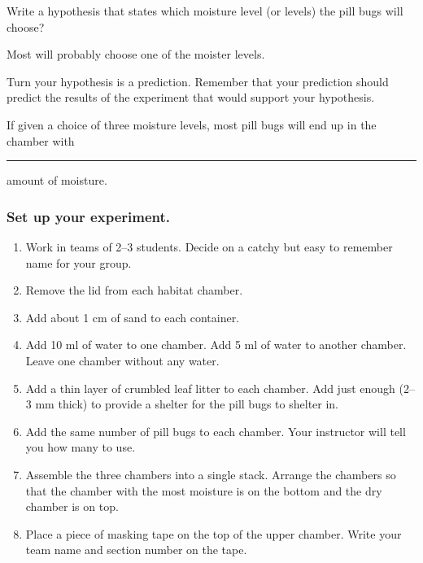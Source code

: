 \documentclass[12pt, hidelinks]{exam}
\newcommand*\AnswerBox[2]{%
    \parbox[t][#1]{0.92\textwidth}{%
    \begin{solution}#2\end{solution}}
    \vspace{\stretch{1}}
}
\newlength{\basespace}
\begin{document}
\begin{questions}

\question \label{ques:hypothesis}
Write a hypothesis that states which moisture level (or levels) the pill bugs will choose?

\AnswerBox{0.35\basespace}{Most will probably choose one of the moister levels.}


\question
Turn your hypothesis is a prediction. Remember that your prediction should predict the results of the experiment that would support your hypothesis. 

\AnswerBox{0.35\basespace}{%
	If given a choice of three moisture levels, most pill bugs will end up in the chamber with \rule{0.75in}{0.4pt} amount of moisture.
}

\subsubsection*{Set up your experiment.}

\begin{enumerate}
	
	\item Work in teams of 2–3 students. Decide on a catchy but easy to remember name for your group.
	
	\item Remove the lid from each habitat chamber. 
	
	\item Add about 1 cm of sand to each container.
	
	\item Add 10 ml of water to one chamber. Add 5 ml of water to another chamber. Leave one chamber without any water.
	
	\item Add a thin layer of crumbled leaf litter to each chamber. Add just enough (2–3 mm thick) to provide a shelter for the pill bugs to shelter in.
	
	\item Add the same number of pill bugs to each chamber. Your instructor will tell you how many to use.
	
	\item Assemble the three chambers into a single stack. Arrange the chambers so that the chamber with the most moisture is on the bottom and the dry chamber is on top. 
	
	\item Place a piece of masking tape on the top of the upper chamber. Write your team name and section number on the tape.
	

\end{enumerate}
\end{questions}
\end{document}
